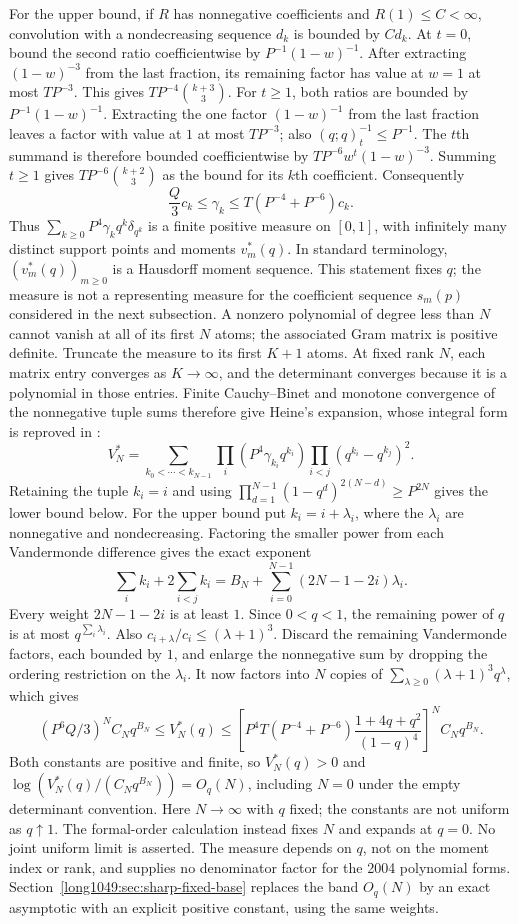 \documentclass[11pt]{article}
\begin{document}
For the upper bound, if $R$ has nonnegative coefficients and
$R(1)\le C<\infty$, convolution with a nondecreasing sequence $d_k$
is bounded by $Cd_k$. At $t=0$, bound the second ratio coefficientwise
by $P^{-1}(1-w)^{-1}$. After extracting $(1-w)^{-3}$ from the last
fraction, its remaining factor has value at $w=1$ at most $TP^{-3}$.
This gives $TP^{-4}\binom{k+3}3$.
For $t\ge1$, both ratios are bounded by $P^{-1}(1-w)^{-1}$.
Extracting the one factor $(1-w)^{-1}$ from the last fraction leaves
a factor with value at $1$ at most $TP^{-3}$; also $(q;q)_t^{-1}\le P^{-1}$.
The $t$th summand is therefore bounded coefficientwise by
$TP^{-6}w^t(1-w)^{-3}$. Summing $t\ge1$ gives
$TP^{-6}\binom{k+2}3$ as the bound for its $k$th coefficient. Consequently
\[
 \frac Q3 c_k\le\gamma_k\le T(P^{-4}+P^{-6})c_k.
\]
Thus $\sum_{k\ge0}P^4\gamma_kq^k\delta_{q^k}$ is a finite positive measure
on $[0,1]$, with infinitely many distinct support points and moments
$v_m^*(q)$. In standard terminology, $(v_m^*(q))_{m\ge0}$ is a
Hausdorff moment sequence. This statement fixes $q$; the measure is
not a representing measure for the coefficient sequence $s_m(p)$
considered in the next subsection.
A nonzero polynomial of degree less than $N$ cannot vanish at all of its
first $N$ atoms; the associated Gram matrix is positive definite.
Truncate the measure to its first $K+1$ atoms. At fixed rank $N$, each
matrix entry converges as $K\to\infty$, and the determinant converges
because it is a polynomial in those entries. Finite Cauchy--Binet and
monotone convergence of the nonnegative tuple sums therefore give
Heine's expansion, whose integral form is reproved in
\cite[Sec.~2, (2)--(5), pp.~2--3]{zudilin2017det}:
\[
 V_N^*=\sum_{k_0<\cdots<k_{N-1}}
 \prod_i(P^4\gamma_{k_i}q^{k_i})\prod_{i<j}(q^{k_i}-q^{k_j})^2.
\]
Retaining the tuple $k_i=i$ and using
$\prod_{d=1}^{N-1}(1-q^d)^{2(N-d)}\ge P^{2N}$ gives the lower bound
below. For the upper bound put $k_i=i+\lambda_i$, where the
$\lambda_i$ are nonnegative and nondecreasing. Factoring the smaller
power from each Vandermonde difference gives the exact exponent
\[
 \sum_i k_i+2\sum_{i<j}k_i
 =B_N+\sum_{i=0}^{N-1}(2N-1-2i)\lambda_i.
\]
Every weight $2N-1-2i$ is at least $1$. Since $0<q<1$, the remaining
power of $q$ is at most $q^{\sum_i\lambda_i}$. Also
$c_{i+\lambda}/c_i\le(\lambda+1)^3$. Discard the remaining
Vandermonde factors, each bounded by $1$, and enlarge the nonnegative
sum by dropping the ordering restriction on the $\lambda_i$.
It now factors into $N$ copies of $\sum_{\lambda\ge0}(\lambda+1)^3q^\lambda$,
which gives
\[
 (P^6Q/3)^N C_Nq^{B_N}\le V_N^*(q)
 \le\left[P^4T(P^{-4}+P^{-6})
          \frac{1+4q+q^2}{(1-q)^4}\right]^N C_Nq^{B_N}.
\]
Both constants are positive and finite, so $V_N^*(q)>0$ and
$\log(V_N^*(q)/(C_Nq^{B_N}))=O_q(N)$, including $N=0$ under the empty
determinant convention.
Here $N\to\infty$ with $q$ fixed; the constants are not uniform as
$q\uparrow1$. The formal-order calculation instead fixes $N$ and expands
at $q=0$. No joint uniform limit is asserted. The measure depends on $q$,
not on the moment index or rank, and supplies no denominator factor for
the 2004 polynomial forms.
Section~\ref{long1049:sec:sharp-fixed-base} replaces the band $O_q(N)$ by an
exact asymptotic with an explicit positive constant, using the same weights.
\end{document}

